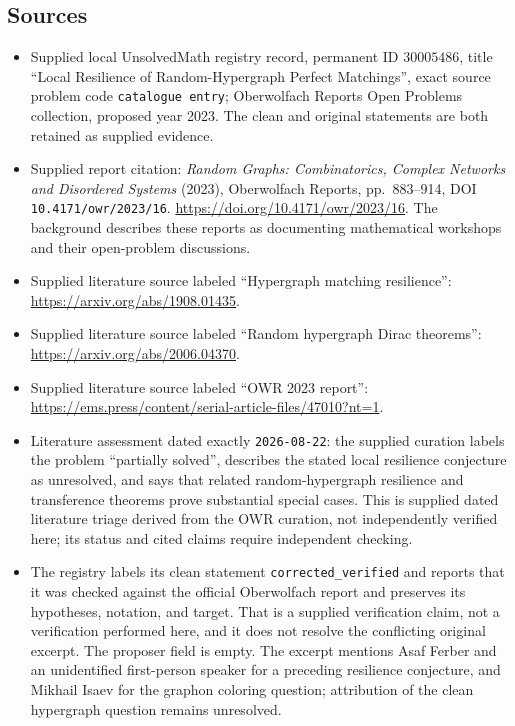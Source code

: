\documentclass[11pt]{article}
\begin{document}
\subsection{Sources}
\begin{itemize}
\item Supplied local UnsolvedMath registry record, permanent ID \(30005486\), title ``Local Resilience of Random-Hypergraph Perfect Matchings'', exact source problem code \texttt{catalogue entry}; Oberwolfach Reports Open Problems collection, proposed year 2023. The clean and original statements are both retained as supplied evidence.
\item Supplied report citation: \emph{Random Graphs: Combinatorics, Complex Networks and Disordered Systems} (2023), Oberwolfach Reports, pp.\ 883--914, DOI \texttt{10.4171/owr/2023/16}. \url{https://doi.org/10.4171/owr/2023/16}. The background describes these reports as documenting mathematical workshops and their open-problem discussions.
\item Supplied literature source labeled ``Hypergraph matching resilience'': \url{https://arxiv.org/abs/1908.01435}.
\item Supplied literature source labeled ``Random hypergraph Dirac theorems'': \url{https://arxiv.org/abs/2006.04370}.
\item Supplied literature source labeled ``OWR 2023 report'': \url{https://ems.press/content/serial-article-files/47010?nt=1}.
\item Literature assessment dated exactly \texttt{2026-08-22}: the supplied curation labels the problem ``partially solved'', describes the stated local resilience conjecture as unresolved, and says that related random-hypergraph resilience and transference theorems prove substantial special cases. This is supplied dated literature triage derived from the OWR curation, not independently verified here; its status and cited claims require independent checking.
\item The registry labels its clean statement \texttt{corrected\_verified} and reports that it was checked against the official Oberwolfach report and preserves its hypotheses, notation, and target. That is a supplied verification claim, not a verification performed here, and it does not resolve the conflicting original excerpt. The proposer field is empty. The excerpt mentions Asaf Ferber and an unidentified first-person speaker for a preceding resilience conjecture, and Mikhail Isaev for the graphon coloring question; attribution of the clean hypergraph question remains unresolved.
\end{itemize}
\end{document}
